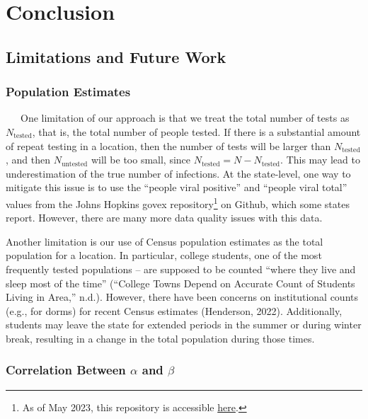 \documentclass[12pt,twoside]{smiththesis}
\begin{document}
\hypertarget{conclusion}{%
\chapter{Conclusion}\label{conclusion}}

\hypertarget{limitations-and-future-work}{%
\section{Limitations and Future Work}\label{limitations-and-future-work}}

\hypertarget{population-estimates}{%
\subsection{Population Estimates}\label{population-estimates}}

~~~One limitation of our approach is that we treat the total number of tests as \(N_{\text{tested}}\), that is, the total number of people tested. If there is a substantial amount of repeat testing in a location, then the number of tests will be larger than \(N_{\text{tested}}\), and then \(N_{\text{untested}}\) will be too small, since \(N_{\text{tested}} = N- N_{\text{tested}}\). This may lead to underestimation of the true number of infections. At the state-level, one way to mitigate this issue is to use the ``people viral positive'' and ``people viral total'' values from the Johns Hopkins govex repository\footnote{As of May 2023, this repository is accessible \href{https://github.com/govex/COVID-19}{here}.} on Github, which some states report. However, there are many more data quality issues with this data.

Another limitation is our use of Census population estimates as the total population for a location.
In particular, college students, one of the most frequently tested populations -- are supposed to be counted ``where they live and sleep most of the time'' ({``College {Towns Depend} on {Accurate Count} of {Students Living} in {Area},''} n.d.). However, there have been concerns on institutional counts (e.g., for dorms) for recent Census estimates (Henderson, 2022). Additionally, students may leave the state for extended periods in the summer or during winter break, resulting in a change in the total population during those times.

\hypertarget{correlation-between-alpha-and-beta}{%
\subsection{\texorpdfstring{Correlation Between \(\alpha\) and \(\beta\)}{Correlation Between \textbackslash alpha and \textbackslash beta}}\label{correlation-between-alpha-and-beta}}
\end{document}
